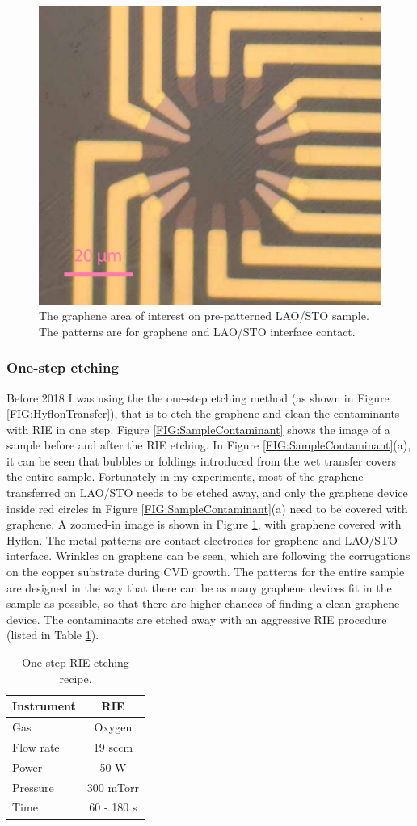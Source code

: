 \documentclass[pdflatex, sectionletters, 12pt]{pittetd}    %
\begin{document}
\begin{figure}[h!]
	\centering
	\includegraphics[width=.5\textwidth]{Drawing/RIEBeforeEtching.pdf}
	\caption{The graphene area of interest on pre-patterned LAO/STO sample. The patterns are for graphene and LAO/STO interface contact.}
	\label{FIG:RIEBeforeEtching}
\end{figure}

\subsubsection{One-step etching}

Before 2018 I was using the the one-step etching method (as shown in Figure \ref{FIG:HyflonTransfer}), that is to etch the graphene and clean the contaminants with RIE in one step. Figure \ref{FIG:SampleContaminant} shows the image of a sample before and after the RIE etching. In Figure \ref{FIG:SampleContaminant}(a), it can be seen that bubbles or foldings introduced from the wet transfer covers the entire sample. Fortunately in my experiments, most of the graphene transferred on LAO/STO needs to be etched away, and only the graphene device inside red circles in Figure \ref{FIG:SampleContaminant}(a) need to be covered with graphene. A zoomed-in image is shown in Figure \ref{FIG:RIEBeforeEtching}, with graphene covered with Hyflon. The metal patterns are contact electrodes for graphene and LAO/STO interface. Wrinkles on graphene can be seen, which are following the corrugations on the copper substrate during CVD growth. The patterns for the entire sample are designed in the way that there can be as many graphene devices fit in the sample as possible, so that there are higher chances of finding a clean graphene device. The contaminants are etched away with an aggressive RIE procedure (listed in Table \ref{TAB:RIESingleStep}). 

\begin{table}
	\centering
	\begin{tabular}{l|c}
		\hline
		Instrument	& RIE \\ \hline
		Gas	&	Oxygen \\ 
		Flow rate	&	19 sccm	\\ 
		Power & 50 W \\
		Pressure	&	300 mTorr	\\
		Time	&	60 - 180 s \\ \hline
	\end{tabular}
	\caption{One-step RIE etching recipe.}
	\label{TAB:RIESingleStep}
\end{table}
\end{document}
